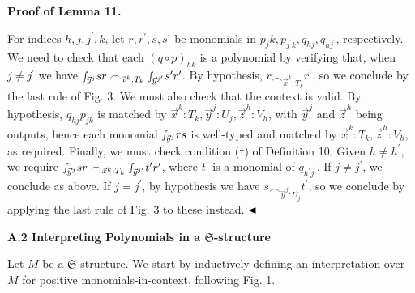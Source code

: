  
 
 
\par\medskip\noindent\textbf{Proof of Lemma 11.}\par
 
 
For indices $h,j,j^{\prime},k$, let $r,r^{\prime},s,s^{\prime}$ be monomials in $p_{j}k,p_{j^{\prime}k},q_{hj},q_{hj^{\prime}}$, respectively. We need to check that each $(q\circ p)_{hk}$ is a polynomial by verifying that, when $j\neq j^{\prime}$ we have ${\smallint\!}_{\vec{y}^{j}}sr\frown_{\vec{x}^{k}:T_{k}}{\smallint\!}_{\vec{y}^%
{j^{\prime}}}s^{\prime}r^{\prime}$. By hypothesis, $r\frown_{\vec{x}^{k}:T_{k}}r^{\prime}$, so we conclude by the last rule of Fig. 3. We must also check that the context is valid. By hypothesis, $q_{hj}p_{jk}$ is matched by $\vec{x}^{k}:T_{k},\vec{y}^{j}:U_{j},\vec{z}^{h}:V_{h}$, with $\vec{y}^{j}$ and $\vec{z}^{h}$ being outputs, hence each monomial ${\smallint\!}_{\vec{y}^{j}}rs$ is well-typed and matched by $\vec{x}^{k}:T_{k},\vec{z}^{h}:V_{h}$, as required. Finally, we must check condition (${\dagger}$) of Definition 10. Given $h\neq h^{\prime}$, we require ${\smallint\!}_{\vec{y}^{j}}sr\frown_{\vec{x}^{k}:T_{k}}{\smallint\!}_{\vec{y}^%
{j^{\prime}}}t^{\prime}r^{\prime}$, where $t^{\prime}$ is a monomial of $q_{h^{\prime}j^{\prime}}$. If $j\neq j^{\prime}$, we conclude as above. If $j=j^{\prime}$, by hypothesis we have $s\frown_{\vec{y}^{j}:U_{j}}t^{\prime}$, so we conclude by applying the last rule of Fig. 3 to these instead. $\hfill\blacktriangleleft$\par
 
 
 


 
\par\medskip\noindent\textbf{A.2 Interpreting Polynomials in a $\mathfrak{S}$-structure}\par
 
 
Let $M$ be a $\mathfrak{S}$-structure. We start by inductively defining an interpretation over $M$ for positive monomials-in-context, following Fig. 1.\par
  
